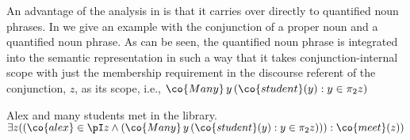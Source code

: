 \documentclass[output=paper]{langsci/langscibook}
\begin{document}









An advantage of the analysis in \citet{Chaves:07} is that it  carries over directly to quantified noun phrases. %
In  we give an example with the conjunction of a proper noun and a quantified noun phrase. 
As can be seen, the quantified noun phrase  is integrated into the semantic representation in such a way that it takes conjunction-internal scope with just the membership requirement in the discourse referent of the conjunction, $z$, as its scope, i.e., $\co{Many}\, y \, (\co{student}(y) : y \in \pi_2 z)$

\ea \label{AlexManyCall}
Alex and many students met in the library.\\
$
\exists z
((\co{alex} \in \pI z
\land 
(\co{Many}\, y\, (\co{student}(y): y \in \pi_2 z)))
: \co{meet}(z))
$
\z 
\end{document}
